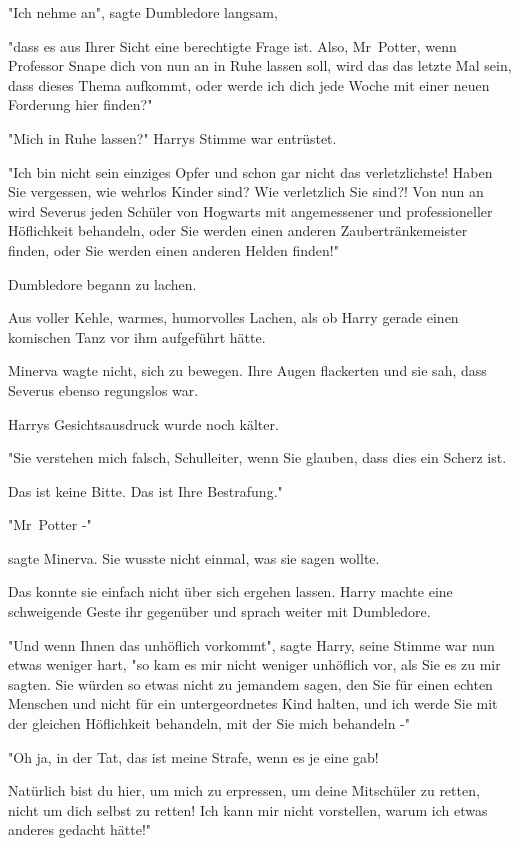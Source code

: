 {"Ich nehme an", sagte Dumbledore langsam,

"dass es aus Ihrer Sicht eine berechtigte Frage ist. Also, Mr~Potter, wenn Professor Snape dich von nun an in Ruhe lassen soll, wird das das letzte Mal sein, dass dieses Thema aufkommt, oder werde ich dich jede Woche mit einer neuen Forderung hier finden?"

"Mich in Ruhe lassen?" Harrys Stimme war entrüstet.

"Ich bin nicht sein einziges Opfer und schon gar nicht das verletzlichste! Haben Sie vergessen, wie wehrlos Kinder sind? Wie verletzlich Sie sind?! Von nun an wird Severus jeden Schüler von Hogwarts mit angemessener und professioneller Höflichkeit behandeln, oder Sie werden einen anderen Zaubertränkemeister finden, oder Sie werden einen anderen Helden finden!"

Dumbledore begann zu lachen.

Aus voller Kehle, warmes, humorvolles Lachen, als ob Harry gerade einen komischen Tanz vor ihm aufgeführt hätte.

Minerva wagte nicht, sich zu bewegen. Ihre Augen flackerten und sie sah, dass Severus ebenso regungslos war.

Harrys Gesichtsausdruck wurde noch kälter.

"Sie verstehen mich falsch, Schulleiter, wenn Sie glauben, dass dies ein Scherz ist.

Das ist keine Bitte. Das ist Ihre Bestrafung."

"Mr~Potter -"

sagte Minerva. Sie wusste nicht einmal, was sie sagen wollte.

Das konnte sie einfach nicht über sich ergehen lassen. Harry machte eine schweigende Geste ihr gegenüber und sprach weiter mit Dumbledore.

"Und wenn Ihnen das unhöflich vorkommt", sagte Harry, seine Stimme war nun etwas weniger hart, "so kam es mir nicht weniger unhöflich vor, als Sie es zu mir sagten. Sie würden so etwas nicht zu jemandem sagen, den Sie für einen echten Menschen und nicht für ein untergeordnetes Kind halten, und ich werde Sie mit der gleichen Höflichkeit behandeln, mit der Sie mich behandeln -"

"Oh ja, in der Tat, das ist meine Strafe, wenn es je eine gab!

Natürlich bist du hier, um mich zu erpressen, um deine Mitschüler zu retten, nicht um dich selbst zu retten! Ich kann mir nicht vorstellen, warum ich etwas anderes gedacht hätte!"

}
